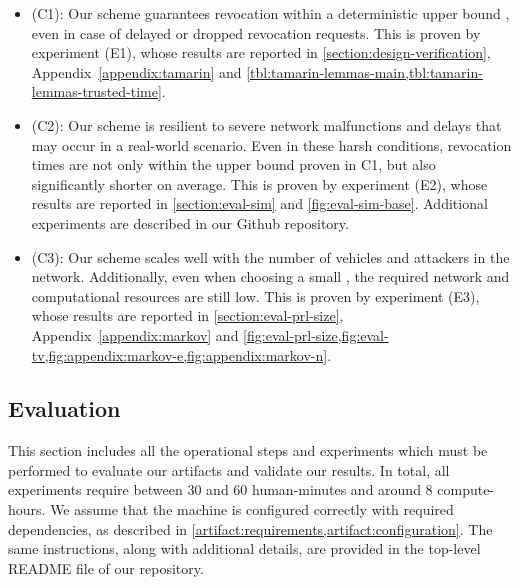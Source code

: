 \begin{itemize}
    \item (C1): Our scheme guarantees revocation within a deterministic upper
    bound \paramteff, even in case of delayed or dropped revocation requests.
    This is proven by experiment (E1), whose results are reported in
    \cref{section:design-verification}, Appendix~\ref{appendix:tamarin} and
    \cref{tbl:tamarin-lemmas-main,tbl:tamarin-lemmas-trusted-time}.
    \item (C2): Our scheme is resilient to severe network malfunctions and
    delays that may occur in a real-world scenario. Even in these harsh
    conditions, revocation times are not only within the upper bound proven in
    C1, but also significantly shorter on average. This is proven by experiment
    (E2), whose results are reported in \cref{section:eval-sim} and
    \cref{fig:eval-sim-base}. Additional experiments are described in our Github
    repository.
    \item (C3): Our scheme scales well with the number of vehicles and attackers
    in the network. Additionally, even when choosing a small \paramteff{}, the
    required network and computational resources are still low. This is proven
    by experiment (E3), whose results are reported in
    \cref{section:eval-prl-size}, Appendix~\ref{appendix:markov} and
    \cref{fig:eval-prl-size,fig:eval-tv,fig:appendix:markov-e,fig:appendix:markov-n}.
\end{itemize}

\subsection{Evaluation}
\label{artifact:evaluation}

This section includes all the operational steps and experiments which must be
performed to evaluate our artifacts and validate our results. In total, all
experiments require between 30 and 60 human-minutes and around 8 compute-hours.
We assume that the machine is configured correctly with required dependencies,
as described in \cref{artifact:requirements,artifact:configuration}. The same
instructions, along with additional details, are provided in the top-level
README file of our repository.

